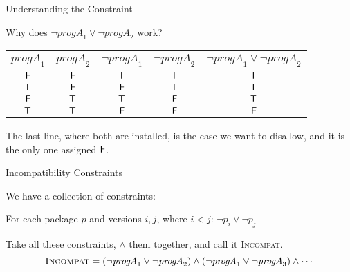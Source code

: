 \documentclass[xetex,aspectratio=169,14pt,hyperref={pdfpagelabels=true,pdflang={en-GB}}]{beamer}
\begin{document}
\begin{frame}[t]
  {Understanding the Constraint}

  Why does $\lnot \mathit{progA}_1 \lor \lnot \mathit{progA}_2$ work?

  \medskip

  \begin{center}
    \begin{tabular}{|c|c|c|c|c|}
      \hline
      $\mathit{progA}_1$&$\mathit{progA}_2$&$\lnot \mathit{progA}_1$&$\lnot \mathit{progA}_2$&$\lnot \mathit{progA}_1 \lor \lnot \mathit{progA}_2$ \\
      \hline
      $\mathsf{F}$&$\mathsf{F}$&$\mathsf{T}$ &$\mathsf{T}$ &$\mathsf{T}$ \\
      $\mathsf{T}$ &$\mathsf{F}$&$\mathsf{F}$&$\mathsf{T}$ &$\mathsf{T}$ \\
      $\mathsf{F}$&$\mathsf{T}$ &$\mathsf{T}$ &$\mathsf{F}$&$\mathsf{T}$ \\
      $\mathsf{T}$ &$\mathsf{T}$ &$\mathsf{F}$&$\mathsf{F}$&$\mathsf{F}$ \\
      \hline
    \end{tabular}
  \end{center}
  The last line, where both are installed, is the case we want to
  disallow, and it is the only one assigned $\mathsf{F}$.



\end{frame}

\begin{frame}
  {Incompatibility Constraints}

  We have a collection of constraints:
  \begin{center}
    For each package $p$ and versions $i, j$, where $i < j$: $\lnot \mathit{p}_i \lor \lnot \mathit{p}_j$
  \end{center}

  \bigskip

  Take all these constraints, $\land$ them together, and call it \textsc{Incompat}.
  \begin{displaymath}
    \textsc{Incompat} = (\lnot \mathit{progA}_1 \lor \lnot \mathit{progA}_2) \land (\lnot \mathit{progA}_1 \lor \lnot \mathit{progA}_3) \land \cdots
  \end{displaymath}
\end{frame}
\end{document}
